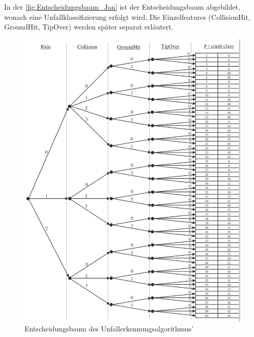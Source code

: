 In der \autoref{fig:Entscheidungsbaum_Jan} ist der Entscheidungsbaum abgebildet, wonach eine Unfallklassifizierung erfolgt wird. Die Einzelfeatures (CollisionHit, GroundHit, TipOver) werden später separat erläutert.
\begin{figure}
	\centering
	\includegraphics[width=\linewidth]{Bilder/Entscheidungsbaum_Jan.png} %
	\caption{Entscheidungsbaum des Unfallerkennungsalgorithmus'\citep{Schneeclassification2021}}
	\label{fig:Entscheidungsbaum_Jan}
\end{figure}


